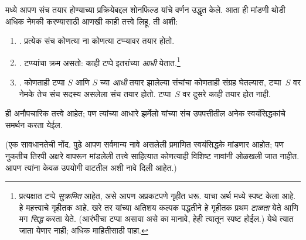 \documentclass[../../../include/open-logic-section]{subfiles}
\begin{document}

 मध्ये आपण संच तयार होण्याच्या प्रक्रियेबद्दल शोनफिल्ड यांचे वर्णन उद्धृत केले. आता ही मांडणी थोडी अधिक नेमकी करण्यासाठी आणखी काही तत्त्वे लिहू. ती अशी:
\begin{enumerate}
\item[] \stageshier. प्रत्येक संच कोणत्या ना कोणत्या टप्प्यावर तयार होतो.
\item[] \stagesord. टप्प्यांचा क्रम असतो: काही टप्पे इतरांच्या \emph{आधी} येतात.\footnote{प्रत्यक्षात टप्पे \emph{सुक्रमित} आहेत, असे आपण अप्रकटपणे गृहीत धरू. याचा अर्थ  मध्ये स्पष्ट केला आहे. हे महत्त्वाचे गृहीतक आहे. खरे तर \citet{Scott1974} यांच्या अतिशय कल्पक पद्धतीने हे गृहीतक प्रथम \emph{टाळता} येते आणि मग \emph{सिद्ध} करता येते. (आरंभीचा टप्पा असावा असे का मानावे, हेही त्यातून स्पष्ट होईल.) येथे त्यात जाता येणार नाही; अधिक माहितीसाठी \citet{ButtonLT1} पाहा.}
\item[] \stagesacc. कोणताही टप्पा $S$ आणि $S$ च्या \emph{आधी} तयार झालेल्या संचांचा कोणताही संग्रह घेतल्यास, टप्पा~$S$ वर नेमके तेच संच सदस्य असलेला संच तयार होतो. टप्पा~$S$ वर दुसरे काही तयार होत नाही.
\end{enumerate}
ही अनौपचारिक तत्त्वे आहेत; पण त्यांच्या आधारे झर्मेलो यांच्या संच उपपत्तीतील अनेक स्वयंसिद्धकांचे समर्थन करता येईल.

(एक सावधानतेची नोंद. पुढे आपण सर्वमान्य नावे असलेली प्रमाणित स्वयंसिद्धके मांडणार आहोत; पण नुकतीच तिरपी अक्षरे वापरून मांडलेली तत्त्वे साहित्यात कोणत्याही विशिष्ट नावांनी ओळखली जात नाहीत. आपण त्यांना केवळ उपयोगी वाटतील अशी नावे दिली आहेत.)
\end{document}
